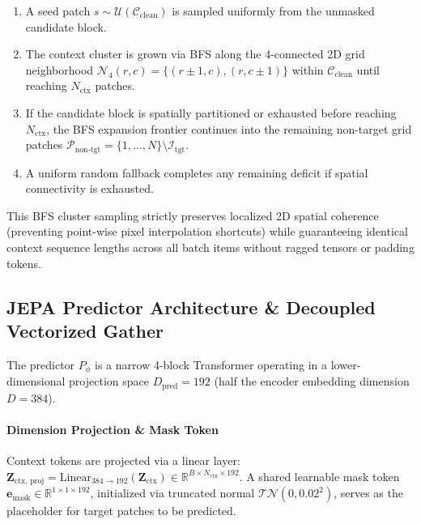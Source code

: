 \documentclass{article}
\begin{document}
\begin{enumerate}
    \begin{enumerate}
        \item A seed patch $s \sim \mathcal{U}(\mathcal{C}_{\text{clean}})$ is sampled uniformly from the unmasked candidate block.
        \item The context cluster is grown via BFS along the 4-connected 2D grid neighborhood $\mathcal{N}_4(r, c) = \{(r\pm 1, c), (r, c\pm 1)\}$ within $\mathcal{C}_{\text{clean}}$ until reaching $N_{\text{ctx}}$ patches.
        \item If the candidate block is spatially partitioned or exhausted before reaching $N_{\text{ctx}}$, the BFS expansion frontier continues into the remaining non-target grid patches $\mathcal{P}_{\text{non-tgt}} = \{1, \dots, N\} \setminus \mathcal{I}_{\text{tgt}}$.
        \item A uniform random fallback completes any remaining deficit if spatial connectivity is exhausted.
    \end{enumerate}
    This BFS cluster sampling strictly preserves localized 2D spatial coherence (preventing point-wise pixel interpolation shortcuts) while guaranteeing identical context sequence lengths across all batch items without ragged tensors or padding tokens.
\end{enumerate}

\subsection{JEPA Predictor Architecture \& Decoupled Vectorized Gather}

The predictor $P_\phi$ is a narrow 4-block Transformer operating in a lower-dimensional projection space $D_{\text{pred}} = 192$ (half the encoder embedding dimension $D = 384$).

\paragraph{Dimension Projection \& Mask Token}
Context tokens are projected via a linear layer: $\mathbf{Z}_{\text{ctx, proj}} = \text{Linear}_{384 \to 192}(\mathbf{Z}_{\text{ctx}}) \in \mathbb{R}^{B \times N_{\text{ctx}} \times 192}$. A shared learnable mask token $\mathbf{e}_{\text{mask}} \in \mathbb{R}^{1 \times 1 \times 192}$, initialized via truncated normal $\mathcal{TN}(0, 0.02^2)$, serves as the placeholder for target patches to be predicted.
\end{document}
